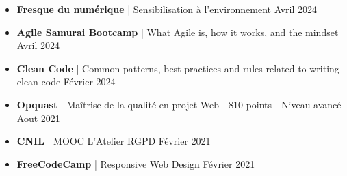 \documentclass{article}
\begin{document}
\noindent
\vspace{1ex}
\begin{itemize}
    \item \textbf{Fresque du numérique} | Sensibilisation à l’environnement \hfill Avril 2024
    \item \textbf{Agile Samurai Bootcamp} | What Agile is, how it works, and the mindset \hfill Avril 2024
    \item \textbf{Clean Code} | Common patterns, best practices and rules related to writing clean code \hfill Février 2024
    \item \textbf{Opquast} | Maîtrise de la qualité en projet Web - 810 points - Niveau avancé \hfill Aout 2021
    \item \textbf{CNIL} | MOOC L'Atelier RGPD \hfill Février 2021
    \item \textbf{FreeCodeCamp} | Responsive Web Design \hfill Février 2021
\end{itemize}
\end{document}
